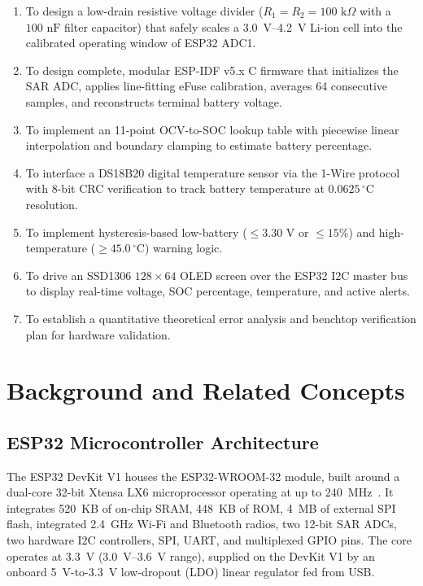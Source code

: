 \documentclass[12pt,a4paper]{article}
\begin{document}
\begin{enumerate}
    \item To design a low-drain resistive voltage divider ($R_1 = R_2 = 100\text{ k}\Omega$ with a $100\text{ nF}$ filter capacitor) that safely scales a 3.0~V--4.2~V Li-ion cell into the calibrated operating window of ESP32 ADC1.
    \item To design complete, modular ESP-IDF v5.x C firmware that initializes the SAR ADC, applies line-fitting eFuse calibration, averages 64 consecutive samples, and reconstructs terminal battery voltage.
    \item To implement an 11-point OCV-to-SOC lookup table with piecewise linear interpolation and boundary clamping to estimate battery percentage.
    \item To interface a DS18B20 digital temperature sensor via the 1-Wire protocol with 8-bit CRC verification to track battery temperature at $0.0625\,^\circ\text{C}$ resolution.
    \item To implement hysteresis-based low-battery ($\le 3.30\text{ V}$ or $\le 15\%$) and high-temperature ($\ge 45.0\,^\circ\text{C}$) warning logic.
    \item To drive an SSD1306 $128 \times 64$ OLED screen over the ESP32 I2C master bus to display real-time voltage, SOC percentage, temperature, and active alerts.
    \item To establish a quantitative theoretical error analysis and benchtop verification plan for hardware validation.
\end{enumerate}

\section{Background and Related Concepts}
\label{sec:background}

\subsection{ESP32 Microcontroller Architecture}
The ESP32 DevKit V1 houses the ESP32-WROOM-32 module, built around a dual-core 32-bit Xtensa LX6 microprocessor operating at up to 240~MHz~\cite{espressif_esp32_ds, espressif_esp32_trm}. It integrates 520~KB of on-chip SRAM, 448~KB of ROM, 4~MB of external SPI flash, integrated 2.4~GHz Wi-Fi and Bluetooth radios, two 12-bit SAR ADCs, two hardware I2C controllers, SPI, UART, and multiplexed GPIO pins. The core operates at 3.3~V (3.0~V--3.6~V range), supplied on the DevKit V1 by an onboard 5~V-to-3.3~V low-dropout (LDO) linear regulator fed from USB.
\end{document}

